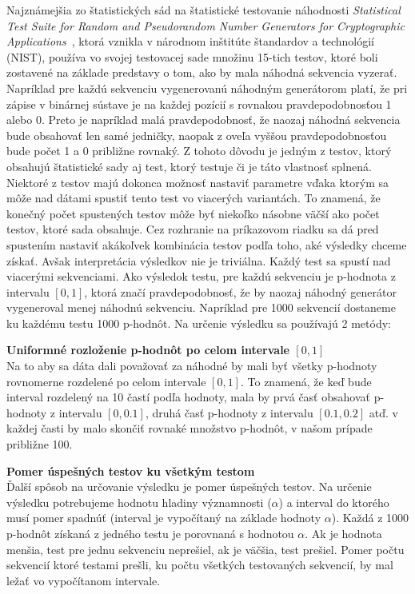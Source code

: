 Najznámejšia zo štatistických sád na štatistické testovanie náhodnosti \textit{Statistical Test Suite for Random and Pseudorandom Number Generators for Cryptographic Applications}~\parencite{nist-sts-documentation}, ktorá vznikla v národnom inštitúte štandardov a technológií (NIST), používa vo svojej testovacej sade množinu 15-tich testov, ktoré boli zostavené na základe predstavy o tom, ako by mala náhodná sekvencia vyzerať. Napríklad pre každú sekvenciu vygenerovanú náhodným generátorom platí, že pri zápise v binárnej sústave je na každej pozícií s rovnakou pravdepodobnosťou 1 alebo 0. Preto je napríklad malá pravdepodobnosť, že naozaj náhodná sekvencia bude obsahovať len samé jedničky, naopak z oveľa vyššou pravdepodobnosťou bude počet 1 a 0 približne rovnaký. Z tohoto dôvodu je jedným z testov, ktorý obsahujú štatistické sady aj test, ktorý testuje či je táto vlastnosť splnená. Niektoré z testov majú dokonca možnosť nastaviť parametre vďaka ktorým sa môže nad dátami spustiť tento test vo viacerých variantách. To znamená, že konečný počet spustených testov môže byť niekoľko násobne väčší ako počet testov, ktoré sada obsahuje. Cez rozhranie na príkazovom riadku sa dá pred spustením nastaviť akákoľvek kombinácia testov podľa toho, aké výsledky chceme získať. Avšak interpretácia výsledkov nie je triviálna. Každý test sa spustí nad viacerými sekvenciami. Ako výsledok testu, pre každú sekvenciu je p-hodnota z intervalu $[0, 1]$, ktorá značí pravdepodobnosť, že by naozaj náhodný generátor vygeneroval menej náhodnú sekvenciu. Napríklad pre 1000 sekvencií dostaneme ku každému testu 1000 p-hodnôt. Na určenie výsledku sa používajú 2 metódy:
\begin{myItemize}
	\item \textbf{Uniformné rozloženie p-hodnôt po celom intervale $[0, 1]$}\\Na to aby sa dáta dali považovať za náhodné by mali byť všetky p-hodnoty rovnomerne rozdelené po celom intervale $[0, 1]$. To znamená, že keď bude interval rozdelený na 10 častí podľa hodnoty, mala by prvá časť obsahovať p-hodnoty z intervalu $[0, 0.1]$, druhá časť p-hodnoty z intervalu $[0.1, 0.2]$ atď. v každej časti by malo skončiť rovnaké množstvo p-hodnôt, v našom prípade približne 100.
	\item \textbf{Pomer úspešných testov ku všetkým testom}\\Ďalší spôsob na určovanie výsledku je pomer úspešných testov. Na určenie výsledku potrebujeme hodnotu hladiny významnosti ($\alpha$) a interval do ktorého musí pomer spadnúť (interval je vypočítaný na základe hodnoty $\alpha$). Každá z 1000 p-hodnôt získaná z jedného testu je porovnaná s hodnotou $\alpha$. Ak je hodnota menšia, test pre jednu sekvenciu neprešiel, ak je väčšia, test prešiel. Pomer počtu sekvencií ktoré testami prešli, ku počtu všetkých testovaných sekvencií, by mal ležať vo vypočítanom intervale.
\end{myItemize}
